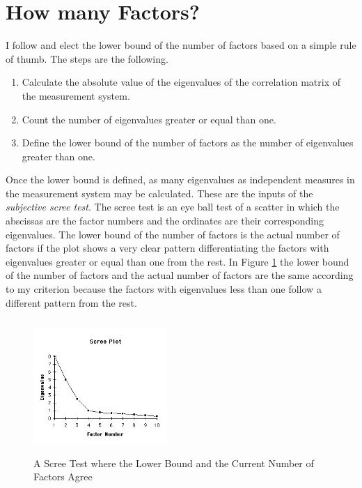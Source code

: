 \section{How many Factors?} \label{sec:nfactors}
\noindent I follow \citet{guttman1954some} and elect the lower bound of the number of factors based on a simple rule of thumb. The steps are the following.
\begin{enumerate}
\item Calculate the absolute value of the eigenvalues of the correlation matrix of the measurement system.
\item Count the number of eigenvalues greater or equal than one.
\item Define the lower bound of the number of factors as the number of eigenvalues greater than one.
\end{enumerate} 

\indent Once the lower bound is defined, as many eigenvalues as independent measures in the measurement system may be calculated. These are the inputs of the \textit{subjective scree test}. The scree test is an eye ball test of a scatter in which the abscissas are the factor numbers and the ordinates are their corresponding eigenvalues. The lower bound of the number of factors is the actual number of factors if the plot shows a very clear pattern differentiating the factors with eigenvalues greater or equal than one from the rest. In Figure \ref{fig:scree} the lower bound of the number of factors and the actual number of factors are the same according to my criterion because the factors with eigenvalues less than one follow a different pattern from the rest.

\begin{figure}[H]
	\caption{A Scree Test where the Lower Bound and the Current Number of Factors Agree} \label{fig:scree}
  	\includegraphics[width=2in, height=2in]{screetest}
\end{figure}

 